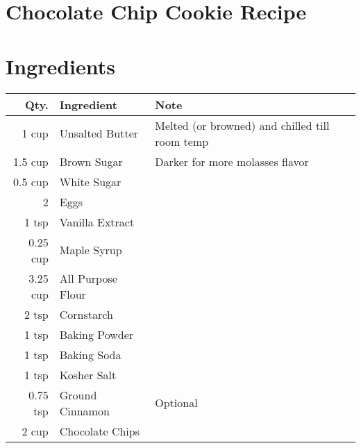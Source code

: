 \documentclass{report}
\theoremstyle{plain} %
\theoremstyle{definition} %
\theoremstyle{plain} %
\begin{document}
\section*{Chocolate Chip Cookie Recipe}
\section*{Ingredients}
\begin{tabular}{r|l|l}
Qty. & Ingredient & Note\\
\hline
1 cup & Unsalted Butter & Melted (or browned) and chilled till room temp\\
1.5 cup & Brown Sugar & Darker for more molasses flavor\\
0.5 cup & White Sugar\\
2 & Eggs\\
1 tsp & Vanilla Extract\\
0.25 cup & Maple Syrup\\
3.25 cup & All Purpose Flour\\
2 tsp & Cornstarch\\
1 tsp & Baking Powder\\
1 tsp & Baking Soda\\
1 tsp & Kosher Salt\\
0.75 tsp & Ground Cinnamon & Optional\\
2 cup & Chocolate Chips
\end{tabular}
\end{document}
